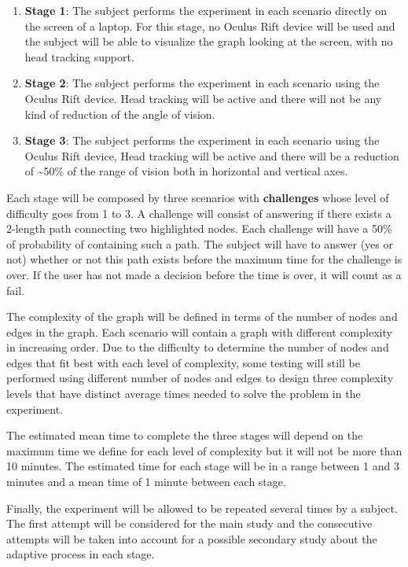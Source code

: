 \begin{enumerate}
\def\labelenumi{\arabic{enumi}.}
\item
  \textbf{Stage 1}: The subject performs the experiment in each scenario
  directly on the screen of a laptop. For this stage, no Oculus Rift
  device will be used and the subject will be able to visualize the
  graph looking at the screen, with no head tracking support.
\item
  \textbf{Stage 2}: The subject performs the experiment in each scenario
  using the Oculus Rift device. Head tracking will be active and there
  will not be any kind of reduction of the angle of vision.
\item
  \textbf{Stage 3}: The subject performs the experiment in each scenario
  using the Oculus Rift device, Head tracking will be active and there
  will be a reduction of \textasciitilde{}50\% of the range of vision
  both in horizontal and vertical axes.
\end{enumerate}

Each stage will be composed by three scenarios with \textbf{challenges}
whose level of difficulty goes from 1 to 3. A challenge will consist of
answering if there exists a 2-length path connecting two highlighted
nodes. Each challenge will have a 50\% of probability of containing such
a path. The subject will have to answer (yes or not) whether or not this
path exists before the maximum time for the challenge is over. If the
user has not made a decision before the time is over, it will count as a
fail.

The complexity of the graph will be defined in terms of the number of
nodes and edges in the graph. Each scenario will contain a graph with
different complexity in increasing order. Due to the difficulty to
determine the number of nodes and edges that fit best with each level of
complexity, some testing will still be performed using different number
of nodes and edges to design three complexity levels that have distinct
average times needed to solve the problem in the experiment.

The estimated mean time to complete the three stages will depend on the
maximum time we define for each level of complexity but it will not be
more than 10 minutes. The estimated time for each stage will be in a
range between 1 and 3 minutes and a mean time of 1 minute between each
stage.

Finally, the experiment will be allowed to be repeated several times by
a subject. The first attempt will be considered for the main study and
the consecutive attempts will be taken into account for a possible
secondary study about the adaptive process in each stage.

